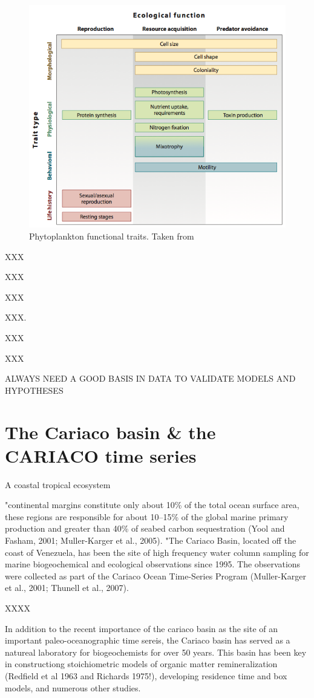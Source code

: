 \begin{figure}
\centering
\includegraphics[width=0.7\linewidth]{./Chp1-Intro/Fig_litchman2008.png}
\caption[Scheme]{\small{Phytoplankton functional traits. Taken from \citet{Litchman2008}}}
\label{phytotrait}
\end{figure}

XXX

XXX

XXX

XXX. 

XXX

XXX

ALWAYS NEED A GOOD BASIS IN DATA TO VALIDATE MODELS AND HYPOTHESES

\section{The Cariaco basin \& the CARIACO time series}

A coastal tropical ecosystem

"continental margins constitute only about 10\% of the total ocean surface area, these regions are responsible for about 10–15\% of the global marine primary production and greater than 40\% of seabed carbon sequestration (Yool and Fasham, 2001; Muller-Karger et al., 2005). 
"The Cariaco Basin, located off the coast of Venezuela, has been the site of high frequency water column sampling for marine biogeochemical and ecological observations since 1995. The observations were collected as part of the Cariaco Ocean Time-Series Program (Muller-Karger et al., 2001; Thunell et al., 2007). 

XXXX

In addition to the recent importance of the cariaco basin as the site of an important paleo-oceanographic time sereis, the Cariaco basin has served as a natureal laboratory for biogeochemists for over 50 years. This basin has been key in constructiong stoichiometric models of organic matter remineralization (Redfield et al 1963 and Richards 1975!), developing residence time and box models, and numerous other studies.

